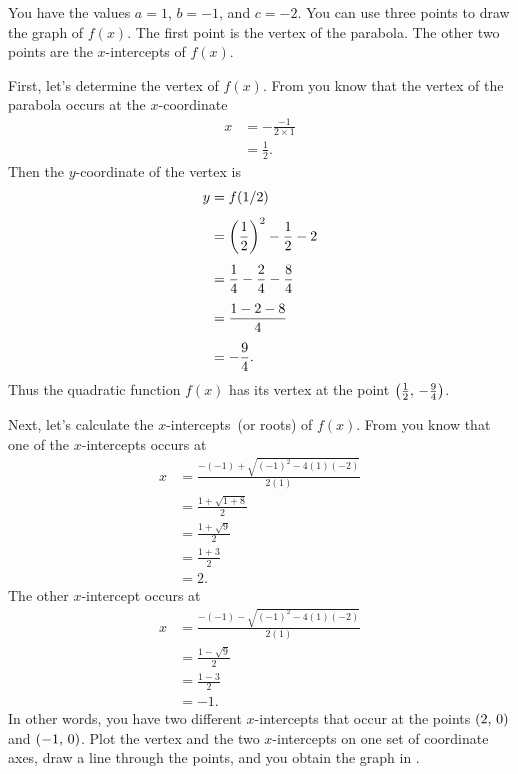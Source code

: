 \documentclass[a4paper,oneside,12pt]{article}
\begin{document}
\begin{solution}
You have the values $a = 1$, $b = -1$, and $c = -2$.  You can use
three points to draw the graph of $f(x)$.  The first point is the
vertex of the parabola.  The other two points are the $x$-intercepts
of $f(x)$.

First, let's determine the vertex of $f(x)$.  From
 you know that the vertex of
the parabola occurs at the $x$-coordinate
\begin{align*}
x
&=
-\frac{-1}{2 \times 1} \\[4pt]
&=
\frac{1}{2}.
\end{align*}
Then the $y$-coordinate of the vertex is
\begin{align*}
y
&=
f(1/2) \\[4pt]
&=
\parenthesis*{\frac{1}{2}}^2 - \frac{1}{2} - 2 \\[4pt]
&=
\frac{1}{4} - \frac{2}{4} - \frac{8}{4} \\[4pt]
&=
\frac{1 - 2 - 8}{4} \\[4pt]
&=
-\frac{9}{4}.
\end{align*}
Thus the quadratic function $f(x)$ has its vertex at the point
$\tuple{\frac{1}{2}}{-\frac{9}{4}}$.

Next, let's calculate the $x$-intercepts~(or roots) of $f(x)$.  From
 you know that one of the
$x$-intercepts occurs at
\begin{align*}
x
&=
\frac{
  -(-1) + \sqrt{(-1)^2 - 4(1)(-2)}
}{
  2(1)
} \\[4pt]
&=
\frac{
  1 + \sqrt{1 + 8}
}{
  2
} \\[4pt]
&=
\frac{
  1 + \sqrt{9}
}{
  2
} \\[4pt]
&=
\frac{
  1 + 3
}{
  2
} \\[4pt]
&=
2.
\end{align*}
The other $x$-intercept occurs at
\begin{align*}
x
&=
\frac{
  -(-1) - \sqrt{(-1)^2 - 4(1)(-2)}
}{
  2(1)
} \\[4pt]
&=
\frac{
  1 - \sqrt{9}
}{
  2
} \\[4pt]
&=
\frac{
  1 - 3
}{
  2
} \\[4pt]
&=
-1.
\end{align*}
In other words, you have two different $x$-intercepts that occur at
the points $\tuple{2}{0}$ and $\tuple{-1}{0}$.  Plot the vertex and
the two $x$-intercepts on one set of coordinate axes, draw a line
through the points, and you obtain the graph in
.
\end{solution}
\end{document}
